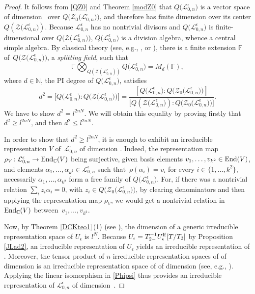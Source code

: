 \documentclass[pdftex]{sigma}
\numberwithin{equation}{section}
\theoremstyle{definition}
\newcommand{\e}{\epsilon}
\newcommand{\mc}{\mathbb{C}}
\newcommand{\Ll}{{\mathcal L}}
\newcommand{\ra}{\rightarrow}
\begin{document}
\begin{proof} It follows from \eqref{QZ0} and Theorem \ref{modZ0} that $Q\bigl(\Ll_{0,n}^\e\bigr)$ is a vector space of dimension~ over $Q\bigl(\mathcal{Z}_0\bigl(\Ll_{0,n}^\e\bigr)\bigr)$, and therefore has finite dimension over its center $Q(\mathcal{Z}\bigl(\Ll_{0,n}^\e\bigr))$. Because $\Ll_{0,n}^\e$ has no nontrivial divisors \cite[Proposition 6.30]{BR} and $Q\bigl(\Ll_{0,n}^\e\bigr)$ is finite-dimensional over $Q\bigl(\mathcal{Z}\bigl(\Ll_{0,n}^\e\bigr)\bigr)$, $Q\bigl(\Ll_{0,n}^\e\bigr)$ is a division algebra, whence a central simple algebra. By classical theory (see, e.g., \cite[Section~13.3.5]{MC-R}, or \cite[Corollary~2.3.25]{Rowen}), there is a finite extension $\mathbb{F}$ of~$Q\bigl(\mathcal{Z}\bigl(\Ll_{0,n}^\e\bigr)\bigr)$, a {\it splitting field}, such that
\[\mathbb{F} \bigotimes_{Q(\mathcal{Z}(\Ll_{0,n}^\e))} Q\bigl(\Ll_{0,n}^\e\bigr) = M_{d}(\mathbb{F}),\]
where $d\in \mathbb{N}$, the PI degree of $Q\bigl(\Ll_{0,n}^\e\bigr)$, satisfies
\begin{equation}\label{factdegree}
d^2 = \bigl[Q\bigl(\Ll_{0,n}^\e\bigr):Q\bigl(\mathcal{Z}\bigl(\Ll_{0,n}^\e\bigr)\bigr)\bigr] = \frac{[Q\bigl(\Ll_{0,n}^\e\bigr):Q\bigl(\mathcal{Z}_0\bigl(\Ll_{0,n}^\e\bigr)\bigr)]}{\bigl[Q(\mathcal{Z}\bigl(\Ll_{0,n}^\e\bigr)): Q\bigl(\mathcal{Z}_0\bigl(\Ll_{0,n}^\e\bigr)\bigr)\bigr]}.
\end{equation}
We have to show $d^2=l^{2nN}$. We will obtain this equality by proving firstly that $d^2\geq l^{2nN}$, and then $d^2\leq l^{2nN}$.

In order to show that $d^2\geq l^{2nN}$, it is enough to exhibit an irreducible representation $V$ of~$\Ll_{0,n}^\e$ of dimension . Indeed, the representation map $\rho_V\colon \Ll_{0,n}^\e\ra {\rm End}_{\mc}(V)$ being surjective, given basis elements $v_1,\dots, v_{k^2}\in {\rm End}(V)$, and elements $\alpha_1,\dots,\alpha_{k^2}\in \Ll_{0,n}^\e$ such that~${\rho(\alpha_i) = v_i}$ for every $i\in \bigl\{1,\dots,k^2\bigr\}$, necessarily $\alpha_1,\dots,\alpha_{k^2}$ form a free family of $Q\bigl(\Ll_{0,n}^\e\bigr)$. For, if there was a nontrivial relation $ \sum_i z_i\alpha_i=0$, with $z_i\in Q\bigl(\mathcal{Z}_0\bigl(\Ll_{0,n}^\e\bigr)\bigr)$, by clearing denominators and then applying the representation map $\rho_V$, we would get a nontrivial relation in~${\rm End}_{\mc}(V)$ between~${v_1,\dots, v_{k^2}}$.

Now, by Theorem \ref{DCKteo1}\,(1) (see \cite[Section 20]{DC-K-P2}), the dimension of a generic irreducible representation space of $U_\e$ is $l^N$. Because $U_\e = T_{2-}^{-1}U_\e^{\rm lf}[T/T_{2}]$ by Proposition \ref{JLad2}, an irreducible representation of $U_\e$ yields an irreducible representation of \smash{$U_\e^{\rm lf}$}. Moreover, the tensor product of $n$ irreducible representation spaces of \smash{$U_\e^{\rm lf}$} of dimension  is an irreducible representation space of \smash{$\big(U_\e^{\rm lf}\big)^{\otimes n}$} of dimension  (see, e.g., \cite[Theorem 3.10.2]{Et}). Applying the linear isomorphism  in \eqref{Phipsi} thus provides an irreducible representation of $\Ll_{0,n}^\e$ of dimension~.


\end{proof}
\end{document}
